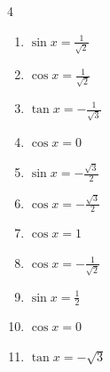 \begin{multicols}{4}
\begin{enumerate}
  \item $\displaystyle \sin{x}  = \frac{1}{\sqrt{2}}$


  \item $\displaystyle \cos{x}  = \frac{1}{\sqrt{2}}$


  \item $\displaystyle \tan{x}  = -\frac{1}{\sqrt{3}}$


  \item $\displaystyle \cos{x}  = 0$


  \item $\displaystyle \sin{x}  = -\frac{\sqrt{3}}{2}$


  \item $\displaystyle \cos{x}  = -\frac{\sqrt{3}}{2}$


  \item $\displaystyle \cos{x}  = 1$


  \item $\displaystyle \cos{x}  = -\frac{1}{\sqrt{2}}$


\columnbreak %

  \item $\displaystyle \sin{x}  = \frac{1}{2}$


  \item $\displaystyle \cos{x}  = 0$


  \item $\displaystyle \tan{x}  = -\sqrt{3}$



\end{enumerate}
\end{multicols}
